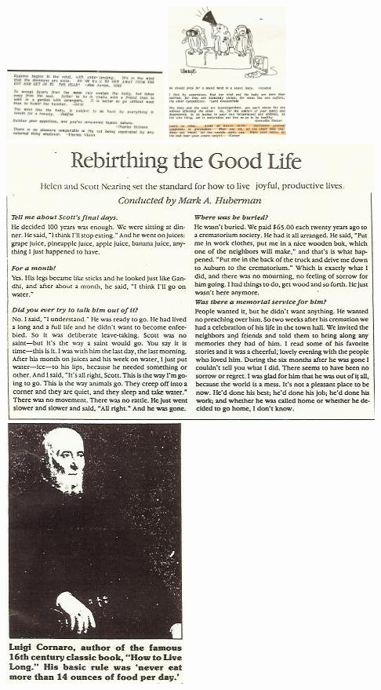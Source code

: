 \documentclass[landscape,twocolumn,letterpaper]{article}
\begin{document}
\clearpage%
\includegraphics[width=0.4\textwidth,bb= 0 0 443 198]{./p31.jpg}
\clearpage%
\includegraphics[width=0.3\textwidth,bb= 0 0 329 253]{./p36.jpg}
\clearpage%
\includegraphics[height=0.5\textheight,bb= 0 0 470
352]{./scott-nearing.jpg}
\clearpage%
\includegraphics[height=0.4\textheight,bb= 0 0 227 332]{./luigi.jpg}
\end{document}
